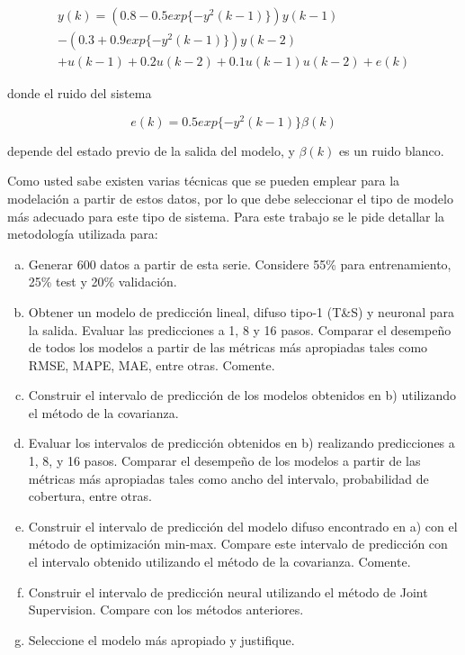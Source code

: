 \documentclass[12pt]{article}
\begin{document}
\begin{align}
y(k)= (0.8 - 0.5 exp\{-y^2(k- 1)\})y(k - 1)\nonumber \\
-(0.3 + 0.9 exp\{-y^2(k - 1)\})y(k - 2)\nonumber \\
+u(k - 1) + 0.2u(k - 2) + 0.1u(k - 1)u(k - 2) + e(k)
\label{e_serie}
\end{align}

donde el ruido del sistema

\begin{equation}
e(k)=  0.5 exp\{-y^2(k- 1)\}\beta(k)
\label{e_error}
\end{equation}

depende del estado previo de la salida del modelo, y $\beta(k)$ es un ruido blanco.

Como usted sabe existen varias técnicas que se pueden emplear para la modelación a partir de estos datos, por lo que debe seleccionar el tipo de modelo más adecuado para este tipo de sistema. Para este trabajo se le pide detallar la metodología utilizada para:

\begin{enumerate}[a)]
\item Generar 600 datos a partir de esta serie. Considere 55\% para entrenamiento, 25\% test y 20\% validación.
\item Obtener un modelo de predicción lineal, difuso tipo-1 (T\&S) y neuronal para la salida. Evaluar las predicciones a 1, 8 y 16 pasos. Comparar el desempeño de todos los modelos a partir de las métricas más apropiadas tales como RMSE, MAPE, MAE, entre otras. Comente.
\item Construir el intervalo de predicción de los modelos obtenidos en b) utilizando el método de la covarianza.
\item Evaluar los intervalos de predicción obtenidos en b) realizando predicciones a 1, 8, y 16 pasos. Comparar el desempeño de los modelos a partir de las métricas más apropiadas tales como ancho del intervalo, probabilidad de cobertura, entre otras.
\item Construir el intervalo de predicción del modelo difuso encontrado en a) con el método de optimización min-max. Compare este intervalo de predicción con el intervalo obtenido utilizando el método de la covarianza. Comente.
\item Construir el intervalo de predicción neural utilizando el método de Joint Supervision. Compare con los métodos anteriores.
\item Seleccione el modelo más apropiado y justifique.
\end{enumerate}
\end{document}

